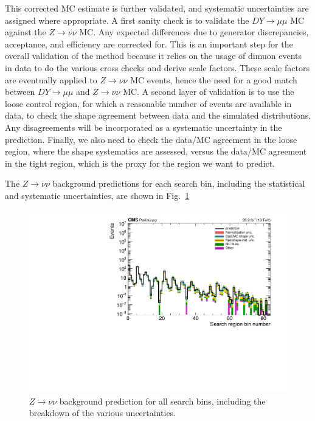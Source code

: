 This corrected MC estimate is further validated, and systematic
uncertainties are assigned where appropriate.
A first sanity check is to validate the $DY\rightarrow \mu \mu$ MC against
the $Z \rightarrow \nu \nu$ MC.  Any expected differences due to generator
discrepancies, acceptance, and efficiency are corrected for.
This is an important step for the overall validation of the method because it relies on
the usage of dimuon events in data to do the various cross checks and derive scale factors.
These scale factors are eventually applied to $Z \rightarrow \nu \nu$ MC events, hence
the need for a good match between $DY\rightarrow \mu \mu$ and $Z \rightarrow \nu \nu$ MC.
A second layer of validation is to use the loose control region, for which a reasonable
number of events are available in data, to check the shape agreement between data
and the simulated distributions.
Any disagreements will be incorporated as a systematic uncertainty in the prediction.
Finally, we also need to check the data/MC agreement in the loose region, where the shape
systematics are assessed, versus the data/MC agreement in the tight region, which is the
proxy for the region we want to predict.


The $Z \rightarrow \nu \nu$ background predictions for each search bin,
including the statistical and systematic uncertainties,
are shown in Fig.~\ref{fig:Zinv_prediction}

\begin{figure}[htbp]
\begin{center}
\includegraphics[width=\textwidth]{sections/mc4/Backgrounds/ZInv/figures/moneyplot.pdf}
\end{center}
\caption{$Z\rightarrow\nu\nu$ background prediction for all search bins, including the breakdown of the various uncertainties.}
\label{fig:Zinv_prediction}
\end{figure}

